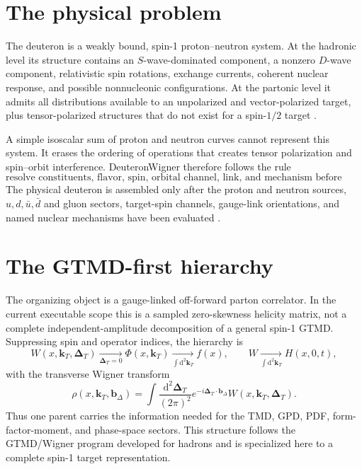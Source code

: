 \documentclass[11pt,oneside]{book}
\newcommand{\kT}{\bm{k}_{T}}
\newcommand{\DeltaT}{\bm{\Delta}_{T}}
\newcommand{\bDelta}{\bm{b}_{\Delta}}
\newcommand{\dd}{\mathrm{d}}
\begin{document}
\section{The physical problem}

The deuteron is a weakly bound, spin-1 proton--neutron system.  At the hadronic level its structure contains an $S$-wave-dominated component, a nonzero $D$-wave component, relativistic spin rotations, exchange currents, coherent nuclear response, and possible nonnucleonic configurations.  At the partonic level it admits all distributions available to an unpolarized and vector-polarized target, plus tensor-polarized structures that do not exist for a spin-$1/2$ target \cite{HoodbhoyJaffeManohar1989,BacchettaMulders2000,KumanoSong2021,BoerEtAl2016}.

A simple isoscalar sum of proton and neutron curves cannot represent this system.  It erases the ordering of operations that creates tensor polarization and spin--orbit interference.  DeuteronWigner therefore follows the rule
\begin{equation}
 \boxed{\text{resolve constituents, flavor, spin, orbital channel, link, and mechanism before summing.}}
 \label{eq:resolve-before-sum}
\end{equation}
The physical deuteron is assembled only after the proton and neutron sources, $u,d,\bar u,\bar d$ and gluon sectors, target-spin channels, gauge-link orientations, and named nuclear mechanisms have been evaluated \cite{DeuteronWignerRepo2026,DWProductionBoundary2026}.

\section{The GTMD-first hierarchy}

The organizing object is a gauge-linked off-forward parton correlator.  In the current executable scope this is a sampled zero-skewness helicity matrix, not a complete independent-amplitude decomposition of a general spin-1 GTMD.  Suppressing spin and operator indices, the hierarchy is
\begin{equation}
 W(x,\kT,\DeltaT)
 \xrightarrow[\DeltaT=0]{} \Phi(x,\kT)
 \xrightarrow[\int \dd^2\kT]{} f(x),
 \qquad
 W\xrightarrow[\int \dd^2\kT]{} H(x,0,t),
 \label{eq:gtmd-hierarchy-one}
\end{equation}
with the transverse Wigner transform
\begin{equation}
 \rho(x,\kT,\bDelta)
 =\int\frac{\dd^2\DeltaT}{(2\pi)^2}
   e^{-i\DeltaT\cdot\bDelta}W(x,\kT,\DeltaT).
 \label{eq:wigner-transform-overview}
\end{equation}
Thus one parent carries the information needed for the TMD, GPD, PDF, form-factor-moment, and phase-space sectors.  This structure follows the GTMD/Wigner program developed for hadrons \cite{BelitskyJiYuan2004,MeissnerMetzSchlegel2009,LorcePasquini2011,EchevarriaGTMD2016} and is specialized here to a complete spin-1 target representation.
\end{document}
